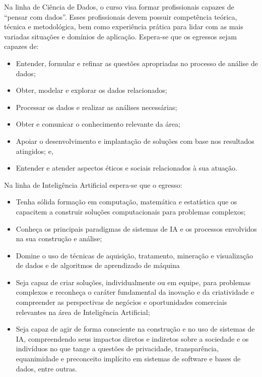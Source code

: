 Na linha de Ciência de Dados, o curso visa formar profissionais capazes de ``pensar com dados''. Esses profissionais devem possuir competência teórica, técnica e metodológica, bem como experiência prática para lidar com as mais variadas situações e domínios de aplicação. Espera-se que os egressos sejam capazes de:

\begin{itemize}
    \item Entender, formular e refinar as questões apropriadas no processo de análise de dados;
    \item Obter, modelar e explorar os dados relacionados;
    \item Processar os dados e realizar as análises necessárias;
    \item Obter e comunicar o conhecimento relevante da área;
    \item Apoiar o desenvolvimento e implantação de soluções com base nos resultados atingidos; e,
    \item Entender e atender aspectos éticos e sociais relacionados à sua atuação.
\end{itemize}

Na linha de Inteligência Artificial espera-se que o egresso:

\begin{itemize}
    \item Tenha sólida formação em computação, matemática e estatística que os capacitem a construir soluções computacionais para problemas complexos;
    \item Conheça os principais paradigmas de sistemas de IA e os processos envolvidos na sua construção e análise;
    \item Domine o uso de técnicas de aquisição, tratamento, mineração e visualização de dados e de algoritmos de aprendizado de máquina
    \item Seja capaz de criar soluções, individualmente ou em equipe, para problemas complexos e reconheça o caráter fundamental da inovação e da criatividade e compreender as perspectivas de negócios e oportunidades comerciais relevantes na área de Inteligência Artificial;
    \item Seja capaz de agir de forma consciente na construção e no uso de sistemas de IA, compreendendo seus impactos diretos e indiretos sobre a sociedade e os indivíduos no que tange a questões de privacidade, transparência, equanimidade e preconceito implícito em sistemas de software e bases de dados, entre outras.
\end{itemize}

